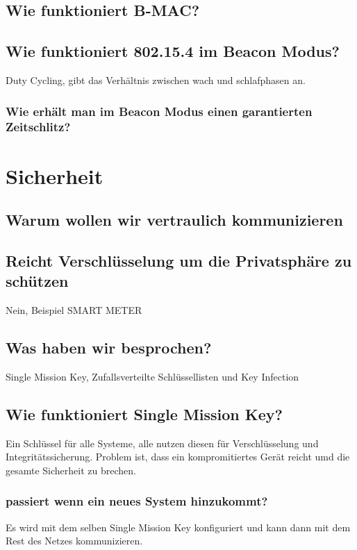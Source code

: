 	\subsection{Wie funktioniert B-MAC?}
	
	\subsection{Wie funktioniert 802.15.4 im Beacon Modus?}
	Duty Cycling, gibt das Verhältnis zwischen wach und schlafphasen an.
	\subsubsection{Wie erhält man im Beacon Modus einen garantierten Zeitschlitz?}
	
	


\section{Sicherheit}
	\subsection{Warum wollen wir vertraulich kommunizieren}
	
	\subsection{Reicht Verschlüsselung um die Privatsphäre zu schützen}
	Nein, Beispiel SMART\- METER
	\subsection{Was haben wir besprochen?}
	Single Mission Key, Zufallsverteilte Schlüssellisten und Key Infection
	
	\subsection{Wie funktioniert Single Mission Key?}
	Ein Schlüssel für alle Systeme, alle nutzen diesen für Verschlüsselung und Integritätssicherung. Problem ist, dass ein kompromitiertes Gerät reicht umd die gesamte Sicherheit zu brechen.
	\subsubsection{passiert wenn ein neues System hinzukommt?}
	Es wird mit dem selben Single Mission Key konfiguriert und kann dann mit dem Rest des Netzes kommunizieren.
	
